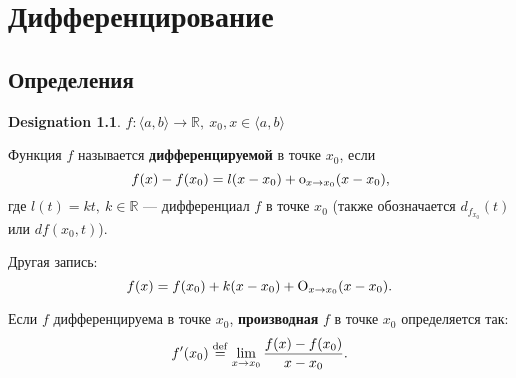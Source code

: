\documentclass[11pt]{book}
\newcommand{\R}{\mathbb{R}}
\newcommand{\oo}{{\mathop{\text{\rm o}}}}
\newcommand{\OO}{{\mathop{\text{\rm O}}}}
\def\mydef{\mathrel{\stackrel{\rm def}=}}
\theoremstyle{definition}
\theoremstyle{plain}
\theoremstyle{plain}
\theoremstyle{definition}
\newtheorem*{name}{Designation}
\theoremstyle{remark}
\begin{document}
\chapter{Дифференцирование}
\section{Определения}
\begin{name}
    $ f: \langle a, b \rangle \to \R, ~ x_0, x \in \langle a,b \rangle$
\end{name}
\begin{defn}
    Функция $ f$ называется {\bf  дифференцируемой} в точке $ x_0$, если 
    \[
	f(x) -f(x_0) = l(x-x_0) + \oo_{x \to  x_0}(x -x_0)
    ,\] 
    где $ l(t) = kt, ~ k \in \R$ --- дифференциал $ f$ в точке  $ x_0$ (также обозначается $ d_{f_{x_0}}(t)$ или $ df(x_0, t)$).

    Другая запись:
    \[
	f(x) = f(x_0) + k(x-x_0) + \OO_{x \to  x_0}(x-x_0)
    .\] 
\end{defn}
\begin{defn}
    Если $ f$ дифференцируема в точке $ x_0$, {\bf производная} $ f$ в  точке $ x_0$ определяется так: 
    \[
	f'(x_0) \mydef \lim_{x \to  x_0} \frac{f(x)-f(x_0)}{x-x_0}
    .\] 
\end{defn}
\end{document}
